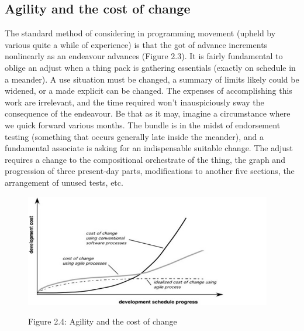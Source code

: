 \documentclass[oneside,12pt]{Classes/VTU}
\begin{document}
    	\subsection{Agility and the cost of change}
    	The standard method of considering in programming movement (upheld by various quite a while of experience) is that the got of advance increments nonlinearly as an endeavour advances (Figure 2.3). It is fairly fundamental to oblige an adjust when a thing pack is gathering essentials (exactly on schedule in a meander). A use situation must be changed, a summary of limits likely could be widened, or a made explicit can be changed. The expenses of accomplishing this work are irrelevant, and the time required won't inauspiciously sway the consequence of the endeavour. Be that as it may, imagine a circumstance where we quick forward various months. The bundle is in the midst of endorsement testing (something that occurs generally late inside the meander), and a fundamental associate is asking for an indispensable suitable change. The adjust requires a change to the compositional orchestrate of the thing, the graph and progression of three present-day parts, modifications to another five sections, the arrangement of unused tests, etc.
    	
    	
    	\begin{figure}
    		\begin{center}
    			\includegraphics[scale=0.7]{images/chotu.png}
    		\end{center}
    		
    		
    		\begin{center}
    				Figure 2.4: Agility and the cost of change
    		\end{center}
    	\end{figure}
\end{document}
